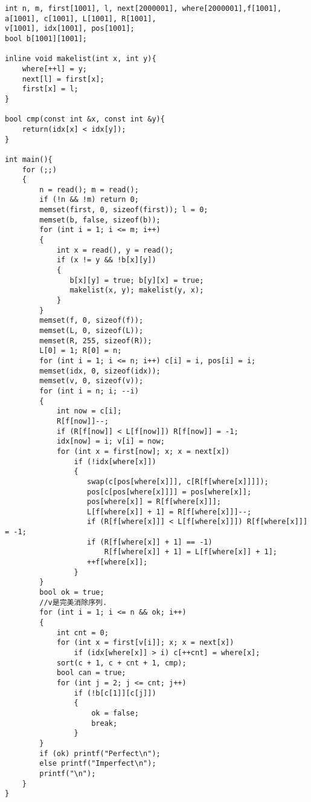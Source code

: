 \begin{lstlisting}
int n, m, first[1001], l, next[2000001], where[2000001],f[1001], a[1001], c[1001], L[1001], R[1001],
v[1001], idx[1001], pos[1001];
bool b[1001][1001];

inline void makelist(int x, int y){
    where[++l] = y;
    next[l] = first[x];
    first[x] = l;
}

bool cmp(const int &x, const int &y){
    return(idx[x] < idx[y]);
}

int main(){
    for (;;)
    {
        n = read(); m = read();
        if (!n && !m) return 0;
        memset(first, 0, sizeof(first)); l = 0;
        memset(b, false, sizeof(b));
        for (int i = 1; i <= m; i++) 
        {
            int x = read(), y = read();
            if (x != y && !b[x][y])
            {
               b[x][y] = true; b[y][x] = true;
               makelist(x, y); makelist(y, x);
            }
        }
        memset(f, 0, sizeof(f));
        memset(L, 0, sizeof(L));
        memset(R, 255, sizeof(R));
        L[0] = 1; R[0] = n;
        for (int i = 1; i <= n; i++) c[i] = i, pos[i] = i;
        memset(idx, 0, sizeof(idx));
        memset(v, 0, sizeof(v));
        for (int i = n; i; --i)
        {
            int now = c[i];
            R[f[now]]--;
            if (R[f[now]] < L[f[now]]) R[f[now]] = -1;
            idx[now] = i; v[i] = now;
            for (int x = first[now]; x; x = next[x])
                if (!idx[where[x]]) 
                {
                   swap(c[pos[where[x]]], c[R[f[where[x]]]]);
                   pos[c[pos[where[x]]]] = pos[where[x]];
                   pos[where[x]] = R[f[where[x]]];
                   L[f[where[x]] + 1] = R[f[where[x]]]--;
                   if (R[f[where[x]]] < L[f[where[x]]]) R[f[where[x]]] = -1;
                   if (R[f[where[x]] + 1] == -1)
                       R[f[where[x]] + 1] = L[f[where[x]] + 1];
                   ++f[where[x]];
                }
        }
        bool ok = true;
        //v是完美消除序列.
        for (int i = 1; i <= n && ok; i++)
        {
            int cnt = 0;
            for (int x = first[v[i]]; x; x = next[x]) 
                if (idx[where[x]] > i) c[++cnt] = where[x];
            sort(c + 1, c + cnt + 1, cmp);
            bool can = true;
            for (int j = 2; j <= cnt; j++)
                if (!b[c[1]][c[j]])
                {
                    ok = false;
                    break;
                }
        }
        if (ok) printf("Perfect\n");
        else printf("Imperfect\n");
        printf("\n");
    }
}
\end{lstlisting}
